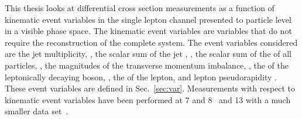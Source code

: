 This thesis looks at differential cross section measurements as a function of kinematic event variables in the single lepton channel presented to particle level in a visible phase space.
The kinematic event variables are variables that do not require the reconstruction of the complete \ttbar{} system.
The event variables considered are the jet multiplicity, \NJET{}, the scalar sum of the jet \pt{}, \HT{}, the scalar sum of the \pt{} of all particles, \ST{}, the magnitudes of the transverse momentum imbalance, \ptmiss{}, the \pt{} of the leptonically decaying \Wboson{} boson, \WPT{}, the \pt{} of the lepton, \LPT{} and lepton pseudorapidity \LETA{}.
These event variables are defined in Sec.~\ref{sec:var}.
Measurements with respect to kinematic event variables have been performed at 7 and 8\TeV{}~\cite{TOP12042} and 13\TeV{} with a much smaller data set~\cite{TOP16014}.





